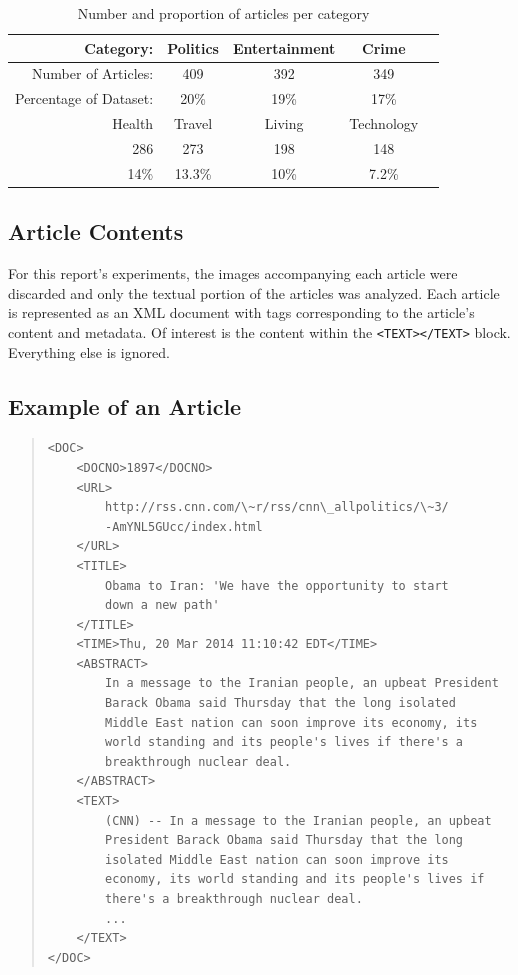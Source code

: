 \documentclass[11pt]{article}
\begin{document}
\begin{table}[h]
	\centering
	\begin{tabular}{ r c c c c  }
		\hline
	Category: &              Politics & Entertainment & Crime & \\ \hline
	Number of Articles: &    409 &      392 &           349 & \\ \hline
	Percentage of Dataset: & 20\% &    19\% &           17\% & \\
	  \hline
	  \hline
	   Health & Travel & Living & Technology \\ \hline
	   286    & 273    & 198    & 148 \\ \hline
	   14\%   & 13.3\% & 10\%   & 7.2\% \\
	\hline
	\end{tabular}
	
	\caption{Number and proportion of articles per category}
	\label{tab:categories}
\end{table}


\subsection{Article Contents}

For this report's experiments, the images accompanying each article were discarded and only the textual portion of the articles was analyzed.
Each article is represented as an XML document with tags corresponding to the article's content and metadata.
Of interest is the content within the \texttt{<TEXT></TEXT>} block.
Everything else is ignored.

\pagebreak
\subsection{Example of an Article}

\small 
\begin{quote} \label{samplearticle}
\begin{verbatim}
<DOC>
    <DOCNO>1897</DOCNO>
    <URL>
        http://rss.cnn.com/\~r/rss/cnn\_allpolitics/\~3/
        -AmYNL5GUcc/index.html
    </URL>
    <TITLE>
        Obama to Iran: 'We have the opportunity to start
        down a new path'
    </TITLE>
    <TIME>Thu, 20 Mar 2014 11:10:42 EDT</TIME>
    <ABSTRACT>
        In a message to the Iranian people, an upbeat President
        Barack Obama said Thursday that the long isolated
        Middle East nation can soon improve its economy, its
        world standing and its people's lives if there's a
        breakthrough nuclear deal.
    </ABSTRACT>
    <TEXT>
        (CNN) -- In a message to the Iranian people, an upbeat
        President Barack Obama said Thursday that the long
        isolated Middle East nation can soon improve its
        economy, its world standing and its people's lives if
        there's a breakthrough nuclear deal.
        ...
    </TEXT>
</DOC>
\end{verbatim}
\end{quote}
\normalsize
\end{document}
